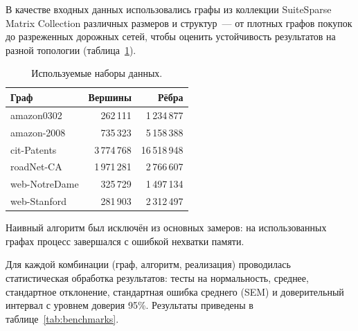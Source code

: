 \documentclass[a4paper]{article}
\begin{document}
В качестве входных данных использовались графы из коллекции SuiteSparse Matrix Collection различных размеров и структур~--- от плотных графов покупок до разреженных дорожных сетей, чтобы оценить устойчивость результатов на разной топологии (таблица~\ref{tab:datasets}).

\begin{table}[h!]
    \centering
    \caption{Используемые наборы данных.}
    \label{tab:datasets}
    \begin{tabular}{lrr}
        \toprule
        \textbf{Граф} & \textbf{Вершины} & \textbf{Рёбра} \\
        \midrule
        amazon0302    & 262\,111    & 1\,234\,877  \\
        amazon-2008   & 735\,323    & 5\,158\,388  \\
        cit-Patents   & 3\,774\,768 & 16\,518\,948 \\
        roadNet-CA    & 1\,971\,281 & 2\,766\,607  \\
        web-NotreDame & 325\,729    & 1\,497\,134  \\
        web-Stanford  & 281\,903    & 2\,312\,497  \\
        \bottomrule
    \end{tabular}
\end{table}

Наивный алгоритм был исключён из основных замеров: на использованных графах процесс завершался с ошибкой нехватки памяти.

Для каждой комбинации (граф, алгоритм, реализация) проводилась статистическая обработка результатов: тесты на нормальность, среднее, стандартное отклонение, стандартная ошибка среднего (SEM) и доверительный интервал с уровнем доверия 95\%.
Результаты приведены в таблице~\ref{tab:benchmarks}.
\end{document}
